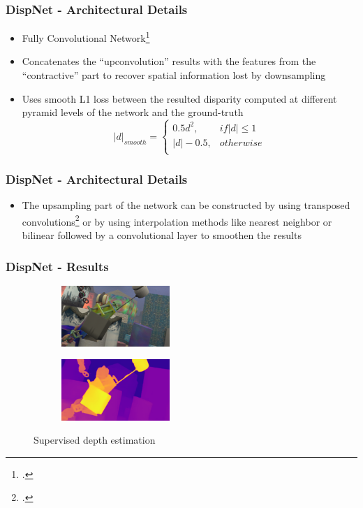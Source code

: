 \documentclass{beamer}
\begin{document}
\begin{frame}
\frametitle{DispNet - Architectural Details}
\center
\begin{itemize}
	\item Fully Convolutional Network\footcite{DBLP:journals/corr/LongSD14}
	\item Concatenates the ``upconvolution'' results with the features from the ``contractive'' part to recover spatial information lost by downsampling
	\item Uses smooth L1 loss between the resulted disparity computed at different pyramid levels of the network and the ground-truth
	\[
	\lvert d \rvert _{smooth}=
	\begin{cases}
	0.5d^2, & if \lvert d \rvert \leq 1\\
	\lvert d \rvert -0.5, & otherwise\\
	\end{cases}
	\]
\end{itemize}
\end{frame}

\begin{frame}
\frametitle{DispNet - Architectural Details}
\center
\begin{itemize}
	\item The upsampling part of the network can be constructed by using transposed convolutions\footcite{Zeiler:2011:ADN:2355573.2356530} or by using interpolation methods like nearest neighbor or bilinear followed by a convolutional layer to smoothen the results
\end{itemize}
\end{frame}

\begin{frame}
\frametitle{DispNet - Results}
\center
\begin{figure}
	\centering
	\begin{subfigure}
		\centering
    	\includegraphics[width=0.45\textwidth]{original_depth.png}
    \end{subfigure}
    \begin{subfigure}
		\centering
        \includegraphics[width=0.45\textwidth]{dispnet_estimation.png}
    \end{subfigure}
    \caption{Supervised depth estimation}
\end{figure}
\end{frame}
\end{document}

